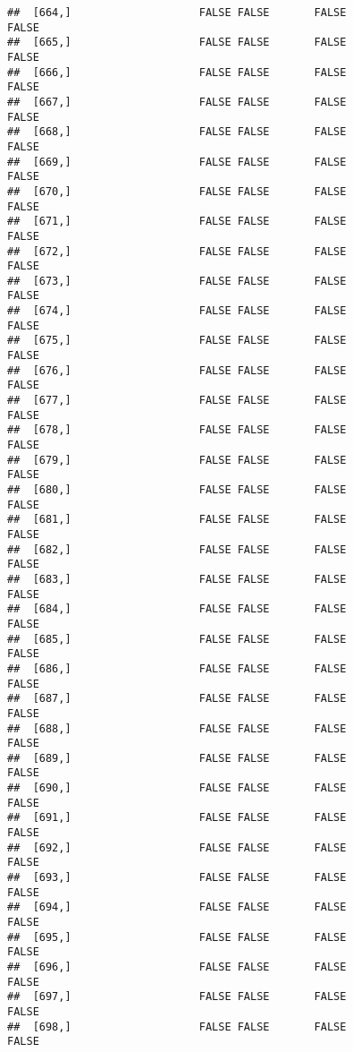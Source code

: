 \documentclass[
]{article}
\begin{document}
\begin{verbatim}
##  [664,]                    FALSE FALSE       FALSE                FALSE
##  [665,]                    FALSE FALSE       FALSE                FALSE
##  [666,]                    FALSE FALSE       FALSE                FALSE
##  [667,]                    FALSE FALSE       FALSE                FALSE
##  [668,]                    FALSE FALSE       FALSE                FALSE
##  [669,]                    FALSE FALSE       FALSE                FALSE
##  [670,]                    FALSE FALSE       FALSE                FALSE
##  [671,]                    FALSE FALSE       FALSE                FALSE
##  [672,]                    FALSE FALSE       FALSE                FALSE
##  [673,]                    FALSE FALSE       FALSE                FALSE
##  [674,]                    FALSE FALSE       FALSE                FALSE
##  [675,]                    FALSE FALSE       FALSE                FALSE
##  [676,]                    FALSE FALSE       FALSE                FALSE
##  [677,]                    FALSE FALSE       FALSE                FALSE
##  [678,]                    FALSE FALSE       FALSE                FALSE
##  [679,]                    FALSE FALSE       FALSE                FALSE
##  [680,]                    FALSE FALSE       FALSE                FALSE
##  [681,]                    FALSE FALSE       FALSE                FALSE
##  [682,]                    FALSE FALSE       FALSE                FALSE
##  [683,]                    FALSE FALSE       FALSE                FALSE
##  [684,]                    FALSE FALSE       FALSE                FALSE
##  [685,]                    FALSE FALSE       FALSE                FALSE
##  [686,]                    FALSE FALSE       FALSE                FALSE
##  [687,]                    FALSE FALSE       FALSE                FALSE
##  [688,]                    FALSE FALSE       FALSE                FALSE
##  [689,]                    FALSE FALSE       FALSE                FALSE
##  [690,]                    FALSE FALSE       FALSE                FALSE
##  [691,]                    FALSE FALSE       FALSE                FALSE
##  [692,]                    FALSE FALSE       FALSE                FALSE
##  [693,]                    FALSE FALSE       FALSE                FALSE
##  [694,]                    FALSE FALSE       FALSE                FALSE
##  [695,]                    FALSE FALSE       FALSE                FALSE
##  [696,]                    FALSE FALSE       FALSE                FALSE
##  [697,]                    FALSE FALSE       FALSE                FALSE
##  [698,]                    FALSE FALSE       FALSE                FALSE

\end{verbatim}
\end{document}
